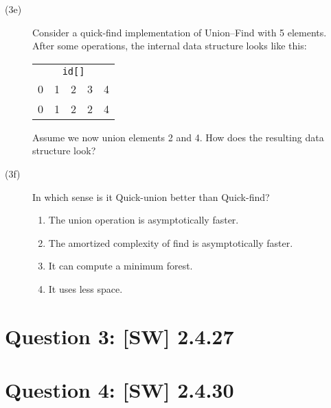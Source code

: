 \documentclass{tufte-handout}
\begin{document}
\begin{description}
  \medskip\item[(3e)]
  Consider a quick-find implementation of Union--Find with 5 elements.
  After some operations, the internal data structure looks like this:

  \begin{tabular}{ccccc}
    \multicolumn{5}{c}{\tt id[]}\\
  0 & 1 & 2 & 3 & 4 \\ 	\hline
  0 & 1 & 2 & 2 & 4 
  \end{tabular}

  Assume we now union elements 2 and 4. How does the resulting data structure look?

  \medskip\item[(3f)]
    In which sense is it Quick-union better than Quick-find? 
      \begin{enumerate}
        \item The union operation is asymptotically faster. 
        \item The amortized complexity of find is asymptotically faster. 
        \item It can compute a minimum forest. 
        \item It uses less space.
      \end{enumerate}
\end{description}

\section{\textbf{Question 3}: [SW] 2.4.27 }


\section{\textbf{Question 4}: [SW] 2.4.30 }
\end{document}
